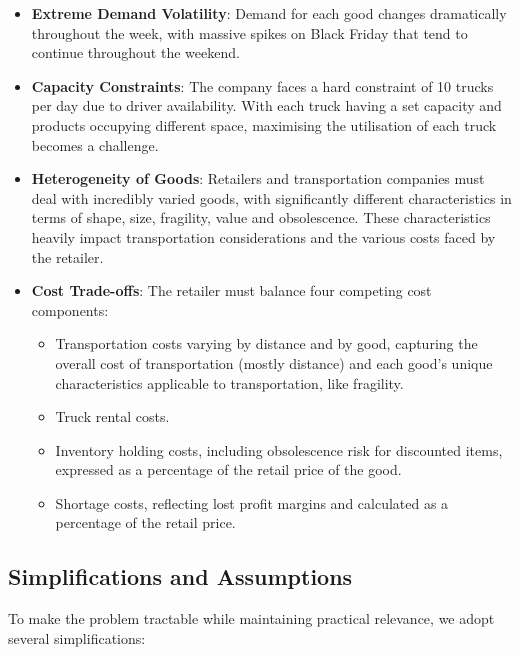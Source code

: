 \documentclass[a4paper,12pt]{article}
\begin{document}
\begin{itemize}
    \item \textbf{Extreme Demand Volatility}: Demand for each good changes dramatically throughout the week, with massive spikes on Black Friday that tend to continue throughout the weekend.
    \item \textbf{Capacity Constraints}: The company faces a hard constraint of 10 trucks per day due to driver availability.
With each truck having a set capacity and products occupying different space, maximising the utilisation of each truck becomes a challenge.
    \item \textbf{Heterogeneity of Goods}: Retailers and transportation companies must deal with incredibly varied goods, with significantly different characteristics in terms of shape, size, fragility, value and obsolescence.
These characteristics heavily impact transportation considerations and the various costs faced by the retailer.
    \item \textbf{Cost Trade-offs}: The retailer must balance four competing cost components:
    \begin{itemize}
        \item Transportation costs varying by distance and by good, capturing the overall cost of transportation (mostly distance) and each good's unique characteristics applicable to transportation, like fragility.
        \item Truck rental costs.
        \item Inventory holding costs, including obsolescence risk for discounted items, expressed as a percentage of the retail price of the good.
        \item Shortage costs, reflecting lost profit margins and calculated as a percentage of the retail price.
    \end{itemize}
\end{itemize}

\subsection{Simplifications and Assumptions}\label{subsec:simplifications-and-assumptions}

To make the problem tractable while maintaining practical relevance, we adopt several simplifications:
\end{document}

